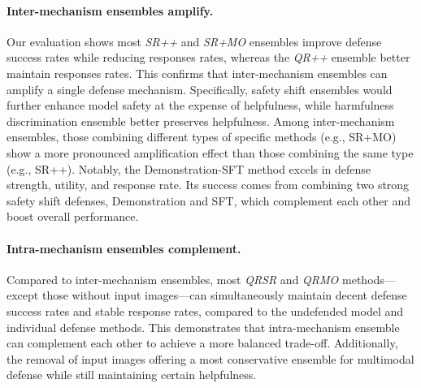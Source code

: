 \paragraph{Inter-mechanism ensembles amplify.} Our evaluation shows most \textit{SR++} and \textit{SR+MO} ensembles improve defense success rates while reducing responses rates, whereas the \textit{QR++} ensemble better maintain responses rates. This confirms that inter-mechanism ensembles can amplify a single defense mechanism. Specifically, safety shift ensembles would further enhance model safety at the expense of helpfulness, while harmfulness discrimination ensemble better preserves helpfulness. Among inter-mechanism ensembles, those combining different types of specific methods (e.g., SR+MO) show a more pronounced amplification effect than those combining the same type (e.g., SR++). 
Notably, the Demonstration-SFT method excels in defense strength, utility, and response rate. Its success comes from combining two strong safety shift defenses, Demonstration and SFT, which complement each other and boost overall performance.

\paragraph{Intra-mechanism ensembles complement.} Compared to inter-mechanism ensembles, most \textit{QR\textbar{}SR} and \textit{QR\textbar{}MO} methods—except those without input images—can simultaneously maintain decent defense success rates and stable response rates,
compared to the undefended model and individual defense methods. This demonstrates that intra-mechanism ensemble can complement each other to achieve a more balanced trade-off. Additionally, the removal of input images offering a most conservative ensemble for multimodal defense while still maintaining certain helpfulness.


